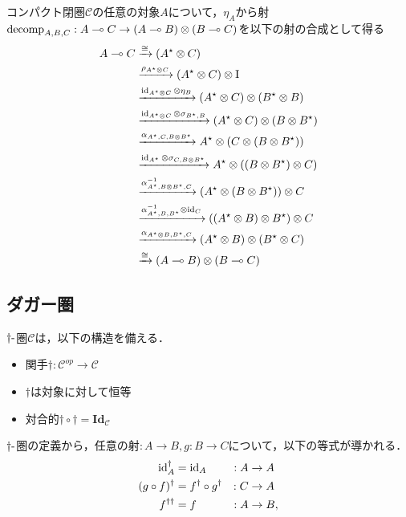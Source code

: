 \documentclass[type_judgement.tex]{subfiles}
\begin{document}
コンパクト閉圏$\mathcal{C}$の任意の対象$A$について，$\eta_A$から射$\mathop{\mathrm{decomp}}\nolimits_{A,B,C}: A \multimap C \rightarrow (A \multimap B) \otimes (B \multimap C)$を以下の射の合成として得る
\begin{align*}
    A \multimap C &\xrightarrow{\cong} (A^\star \otimes C) \\
                  &\xrightarrow{\rho_{A^\star \otimes C}} (A^\star \otimes C) \otimes \mathrm{I} \\
                  &\xrightarrow{\mathop{\mathrm{id}}\nolimits_{A^\star \otimes C} \otimes \eta_B} (A^\star \otimes C) \otimes (B^\star \otimes B) \\
                  &\xrightarrow{\mathop{\mathrm{id}}\nolimits_{A^\star \otimes C} \otimes \sigma_{B^\star,B}} (A^\star \otimes C) \otimes (B \otimes B^\star) \\
                  &\xrightarrow{\alpha_{A^\star,C,B \otimes B^\star}} A^\star \otimes (C \otimes (B \otimes B^\star)) \\
                  &\xrightarrow{\mathop{\mathrm{id}}\nolimits_{A^\star} \otimes \sigma_{C,B \otimes B^\star}} A^\star \otimes ((B \otimes B^\star) \otimes C) \\
                  &\xrightarrow{\alpha^{-1}_{A^\star, B \otimes B^\star, C}} (A^\star \otimes (B \otimes B^\star)) \otimes C \\
                  &\xrightarrow{\alpha^{-1}_{A^\star, B, B^\star} \otimes \mathop{\mathrm{id}}\nolimits_C} ((A^\star \otimes B) \otimes B^\star) \otimes C \\
                  &\xrightarrow{\alpha_{A^\star \otimes B, B^\star, C}} (A^\star \otimes B) \otimes (B^\star \otimes C) \\
                  &\xrightarrow{\cong} (A \multimap B) \otimes (B \multimap C)
\end{align*}

\subsection{ダガー圏}
\begin{defn}
$\dagger\mathchar`-$圏$\mathcal{C}$は，以下の構造を備える．
\begin{itemize}
    \item 関手$\dagger:\mathcal{C}^{op} \rightarrow \mathcal{C}$
    \item $\dagger$は対象に対して恒等
    \item 対合的$\dagger\circ\dagger = \mathbf{Id}_\mathcal{C}$
\end{itemize}
\end{defn}
$\dagger\mathchar`-$圏の定義から，任意の射$:A \rightarrow B, g:B \rightarrow C$について，以下の等式が導かれる．
\begin{alignat*}{2}
    \mathop{\mathrm{id}}\nolimits_A^\dagger       &= \mathop{\mathrm{id}}\nolimits_A                      &:A &\rightarrow A \\
    (g\circ f)^\dagger &= f^\dagger \circ g^\dagger &:C &\rightarrow A \\
    f^{\dagger\dagger} &= f                         &:A &\rightarrow B,
\end{alignat*}
\end{document}
